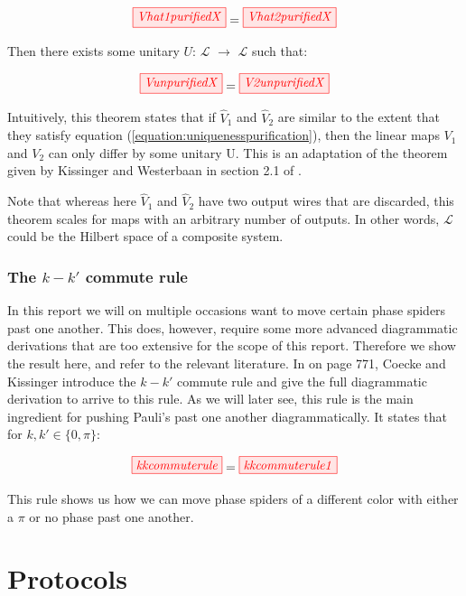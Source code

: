 \documentclass[]{article}
\begin{document}
\begin{equation}
	\label{equation:uniquenesspurification}
	\tikzfig{Vhat1purifiedX} = \tikzfig{Vhat2purifiedX}
\end{equation}

Then there exists some unitary $U$: $\mathcal{L}$ $\rightarrow$ $\mathcal{L}$ such that:

\begin{equation}
	\tikzfig{VunpurifiedX} = \tikzfig{V2unpurifiedX}
\end{equation}

Intuitively, this theorem states that if $\hat{V}_1$ and $\hat{V}_2$ are similar to the extent that they satisfy equation (\ref{equation:uniquenesspurification}), then the linear maps $V_1$ and $V_2$ can only differ by some unitary U. This is an adaptation of the theorem given by Kissinger and Westerbaan in section 2.1 of \cite{Kissinger2017}.

Note that whereas here $\hat{V}_1$ and $\hat{V}_2$ have two output wires that are discarded, this theorem scales for maps with an arbitrary number of outputs. In other words, $\mathcal{L}$ could be the Hilbert space of a composite system.

\subsubsection{The $k-k'$ commute rule}
\label{section:kkcommute}
In this report we will on multiple occasions want to move certain phase spiders past one another. This does, however, require some more advanced diagrammatic derivations that are too extensive for the scope of this report. Therefore we show the result here, and refer to the relevant literature. In \cite{Coecke2017} on page 771, Coecke and Kissinger introduce the $k-k'$ commute rule and give the full diagrammatic derivation to arrive to this rule. As we will later see, this rule is the main ingredient for pushing Pauli's past one another diagrammatically. It states that for $k, k' \in \{0, \pi\}$: 

\begin{equation}
\label{equation:kkcommuterule}
\tikzfig{kkcommuterule} = \tikzfig{kkcommuterule1}
\end{equation}

This rule shows us how we can move phase spiders of a different color with either a $\pi$ or no phase past one another.

\section{Protocols}
\label{section:protocols}
\end{document}
